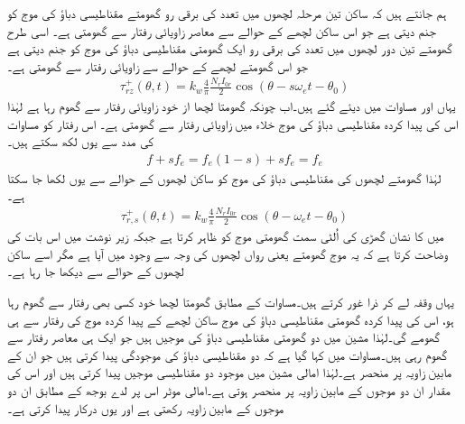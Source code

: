 ہم جانتے ہیں کہ ساکن تین مرحلہ لچھوں میں  تعدد کی برقی رو   گھومتے مقناطیسی دباؤ کی موج کو جنم دیتی ہے جو اس ساکن لچھے کے حوالے سے   معاصر زاویائی رفتار سے گھومتی ہے۔ اسی طرح گھومتے تین دور لچھوں میں  تعدد کی برقی رو ایک گھومتی مقناطیسی دباؤ کی موج  کو جنم دیتی ہے جو اس گھومتے لچھے کے حوالے سے   زاویائی رفتار سے گھومتی ہے۔
\begin{align}
\tau_{rz}^+(\theta,t)=k_w \frac{4}{\pi} \frac{N_r I_{0r}}{2} \cos \left(\theta-s \omega_e t -\theta_0 \right)
\end{align}
یہاں   اور  مساوات  میں دیئے گئے ہیں۔اب چونکہ گھومتا لچھا از خود  زاویائی رفتار سے گھوم رہا ہے لہٰذا اس کی پیدا کردہ مقناطیسی دباؤ کی موج خلاء میں  زاویائی رفتار سے گھومتی ہے۔ اس رفتار کو مساوات   کی مدد سے یوں لکھ سکتے ہیں۔
\begin{align}
f+s f_e= f_e (1-s)+ s f_e=f_e
\end{align}
لہٰذا گھومتے لچھوں کی مقناطیسی دباؤ کی موج کو ساکن لچھوں کے حوالے سے یوں لکھا جا سکتا ہے۔
\begin{align}\label{مساوات_امالی_گھومتے_حصے_کی_موج}
\tau_{r,s}^+(\theta,t)=k_w \frac{4}{\pi} \frac{N_r I_{0r}}{2} \cos \left(\theta-\omega_e t -\theta_0 \right)
\end{align}
 میں  کا نشان گھڑی کی اُلٹی سمت گھومتی موج کو ظاہر کرتا ہے جبکہ زیر نوشت  میں  اس بات کی وضاحت کرتا ہے کہ یہ موج گھومتے یعنی رواں لچھوں کی وجہ سے وجود میں آیا ہے مگر اسے ساکن لچھوں کے حوالے سے دیکھا جا رہا ہے۔

یہاں وقفہ لے کر ذرا غور کرتے ہیں۔مساوات   کے مطابق گھومتا لچھا خود کسی بھی رفتار سے گھوم رہا ہو، اس کی پیدا کردہ گھومتی مقناطیسی دباؤ کی موج ساکن لچھے کے پیدا کردہ موج کی رفتار سے ہی گھومے گی۔لہٰذا مشین میں دو گھومتی مقناطیسی دباؤ کی موجیں ہیں جو ایک ہی معاصر رفتار سے گھوم رہی ہیں۔مساوات   میں کہا گیا ہے کہ دو مقناطیسی دباؤ کی موجودگی  پیدا کرتی ہیں جو ان کے مابین زاویہ پر منحصر ہے۔لہٰذا امالی مشین میں موجود دو مقناطیسی موجیں  پیدا کرتی ہیں اور اس  کی مقدار ان دو موجوں کے مابین زاویہ پر منحصر ہوتی ہے۔امالی موٹر اس پر لدے بوجھ کے مطابق ان دو موجوں کے مابین زاویہ رکھتی ہے اور یوں درکار  پیدا کرتی ہے۔

